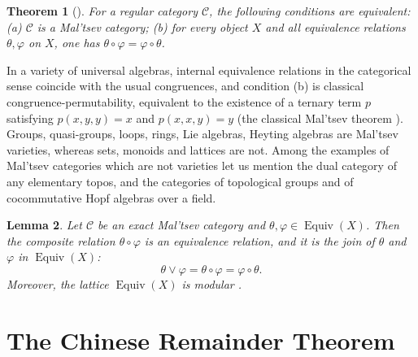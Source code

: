 \documentclass[11pt,a4paper]{article}
\theoremstyle{plain}
\newtheorem{theoreme}{Theorem}[section]
\newtheorem{lemme}[theoreme]{Lemma}
\theoremstyle{definition}
\theoremstyle{remark}
\theoremstyle{plain}
\newcommand{\C}{\mathcal{C}}
\newcommand{\Equiv}{\operatorname{Equiv}}
\newcommand{\op}{\mathrm{o}}
\begin{document}
\begin{theoreme}[{\cite{CKP}}]\label{thm:ckp}
For a regular category $\C$, the following conditions are equivalent:
(a) $\C$ is a Mal'tsev category;
(b) for every object $X$ and all equivalence relations $\theta, \varphi$ on $X$, one
has $\theta \circ \varphi = \varphi \circ \theta$.
\end{theoreme}

In a variety of universal algebras, internal equivalence relations in the categorical
sense coincide with the usual congruences, and condition (b) is classical
congruence-permutability, equivalent to the existence of a ternary term $p$
satisfying $p(x,y,y) = x$ and $p(x,x,y) = y$ (the classical Mal'tsev theorem \cite{Malcev}).
Groups, quasi-groups, loops, rings, Lie algebras, Heyting algebras are Mal'tsev varieties, whereas sets, monoids and
lattices are not. Among the examples of Mal'tsev categories which are not varieties let us mention the dual category of any elementary topos, and the categories of topological groups and of cocommutative Hopf algebras over a field.

\begin{lemme}\label{lem:sup}\cite{CLP}
Let $\C$ be an exact Mal'tsev category and
$\theta, \varphi \in \Equiv(X)$. Then the composite relation $\theta \circ \varphi$
is an equivalence relation, and it is the join of $\theta$ and $\varphi$ in
$\Equiv(X)$:
\[
\theta \vee \varphi = \theta \circ \varphi = \varphi \circ \theta .
\]
Moreover, the lattice $\Equiv(X)$ is modular \cite{CKP}.
\end{lemme}


\section{The Chinese Remainder Theorem}
\end{document}
